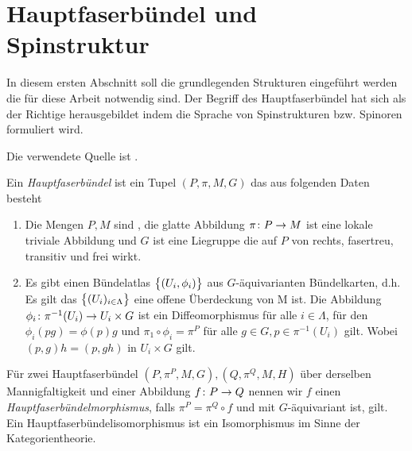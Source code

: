 

\section{Hauptfaserbündel und Spinstruktur}

In diesem ersten Abschnitt soll die grundlegenden Strukturen
eingeführt werden die für diese Arbeit notwendig sind. Der Begriff des
Hauptfaserbündel hat sich als der Richtige herausgebildet indem die
Sprache von Spinstrukturen bzw. Spinoren formuliert wird.

Die verwendete Quelle ist \cite{baum09}.

\begin{Def}[Hauptfaserbündel]
  Ein \textit{Hauptfaserbündel} ist ein Tupel $(P,\pi,M,G)$ das aus
  folgenden Daten besteht
	\begin{enumerate}[\textbullet]
        \item Die Mengen $P,M$ sind \mfgen, die glatte Abbildung
          $ \pi \colon P \rightarrow M $ ist eine lokale triviale Abbildung und
          $G$ ist eine Liegruppe die auf $P$ von rechts, fasertreu,
          transitiv und frei wirkt.   
        \item Es gibt einen Bündelatlas $\bigl\{ (U_i,\phi_i) \bigr\}$ aus
          $G$-äquivarianten Bündelkarten, d.h.  Es gilt das
          $\bigl\{ (U_i)_{i \in \Lambda} \bigr\}$ eine offene Überdeckung von M
          ist. Die Abbildung
          $ \phi_i \colon \pi^{-1}(U_i) \rightarrow U_i\times G $ ist ein
          Diffeomorphismus für alle $i \in \Lambda $, für den
          $ \phi_i(pg) = \phi(p) g $ und
          $ \pi_1 \circ \phi_i = \pi^P $ für alle
          $ g \in G, p \in \pi^{-1}(U_i) $ gilt. Wobei
          $ (p,g) h = (p,gh) $ in $ U_i\times G $ gilt.
	\end{enumerate}		
	Für zwei Hauptfaserbündel $(P,\pi^P,M,G),(Q,\pi^Q,M,H)$ über
        derselben Mannigfaltigkeit und einer Abbildung $f \colon P \rightarrow Q$
        nennen wir $f$ einen \textit{Hauptfaserbündelmorphismus},
        falls $ \pi^P=\pi^Q \circ f $ und mit $ G $-äquivariant ist, gilt. Ein Hauptfaserbündelisomorphismus ist ein Isomorphismus im Sinne
        der Kategorientheorie.
\end{Def}

